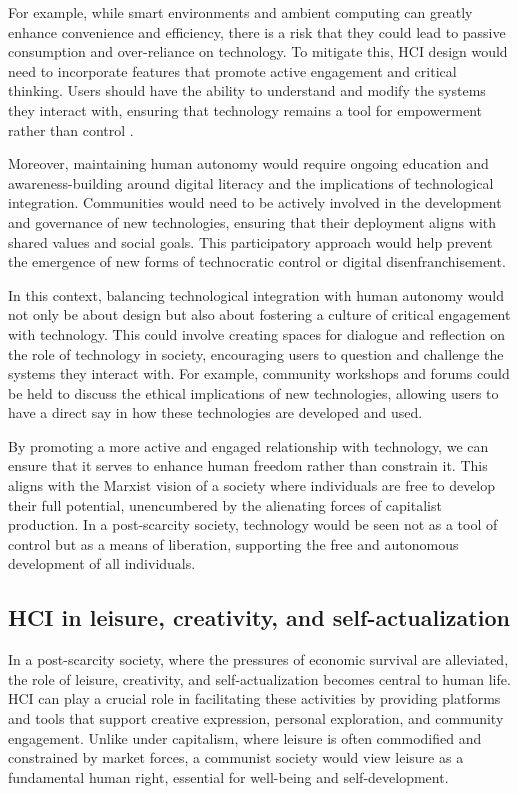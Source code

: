 For example, while smart environments and ambient computing can greatly enhance convenience and efficiency, there is a risk that they could lead to passive consumption and over-reliance on technology. To mitigate this, HCI design would need to incorporate features that promote active engagement and critical thinking. Users should have the ability to understand and modify the systems they interact with, ensuring that technology remains a tool for empowerment rather than control \cite[pp.~110-112]{haraway1991}.

Moreover, maintaining human autonomy would require ongoing education and awareness-building around digital literacy and the implications of technological integration. Communities would need to be actively involved in the development and governance of new technologies, ensuring that their deployment aligns with shared values and social goals. This participatory approach would help prevent the emergence of new forms of technocratic control or digital disenfranchisement.

In this context, balancing technological integration with human autonomy would not only be about design but also about fostering a culture of critical engagement with technology. This could involve creating spaces for dialogue and reflection on the role of technology in society, encouraging users to question and challenge the systems they interact with. For example, community workshops and forums could be held to discuss the ethical implications of new technologies, allowing users to have a direct say in how these technologies are developed and used.

By promoting a more active and engaged relationship with technology, we can ensure that it serves to enhance human freedom rather than constrain it. This aligns with the Marxist vision of a society where individuals are free to develop their full potential, unencumbered by the alienating forces of capitalist production. In a post-scarcity society, technology would be seen not as a tool of control but as a means of liberation, supporting the free and autonomous development of all individuals.

\subsection{HCI in leisure, creativity, and self-actualization}

In a post-scarcity society, where the pressures of economic survival are alleviated, the role of leisure, creativity, and self-actualization becomes central to human life. HCI can play a crucial role in facilitating these activities by providing platforms and tools that support creative expression, personal exploration, and community engagement. Unlike under capitalism, where leisure is often commodified and constrained by market forces, a communist society would view leisure as a fundamental human right, essential for well-being and self-development.

